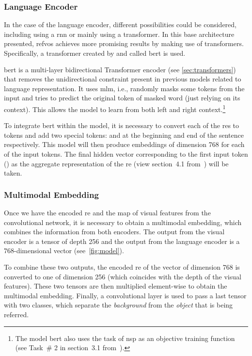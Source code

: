 \subsubsection{Language Encoder}

In the case of the language encoder, different possibilities could be
considered, including using a \gls{rnn} or mainly using a transformer. In this
base architecture presented, \gls{refvos} achieves more promising results by
making use of transformers. Specifically, a transformer created by
 and called \gls{bert} is used.

\gls{bert} is a multi-layer bidirectional Transformer encoder (see
\vref{sec:transformers}) that removes the unidirectional constraint present in
previous models related to language representation. It uses \gls{mlm}, i.e.,
randomly masks some tokens from the input and tries to predict the original
token of masked word (just relying on its context). This allows the model to
learn from both left and right context.\footnote{The model \gls{bert} also uses
  the task of \gls{nsp} as an objective training function (see Task~\# 2 in
  section~3.1 from~\cite{devlin19:bert}).}

To integrate \gls{bert} within the model, it is necessary to convert each of
the \glspl{re} to tokens and add two special tokens: \code{[CLS]} and
\code{[SEP]} at the beginning and end of the sentence respectively. This model
will then produce embeddings of dimension 768 for each of the input tokens. The
final hidden vector corresponding to the first input token (\code{[CLS]}) as
the aggregate representation of the \gls{re} (view section~4.1
from~\cite{devlin19:bert}) will be taken.

\subsubsection{Multimodal Embedding}

Once we have the encoded \gls{re} and the map of visual features from the
convolutional network, it is necessary to obtain a multimodal embedding, which
combines the information from both encoders. The output from the visual encoder
is a tensor of depth 256 and the output from the language encoder is a
768-dimensional vector (see\ \vref{fig:model}).

To combine these two outputs, the encoded \gls{re} of the vector of dimension
768 is converted to one of dimension 256 (which coincides with the depth of the
visual features). These two tensors are then multiplied element-wise to obtain
the multimodal embedding. Finally, a convolutional layer is used to pass a last
tensor with two classes, which separate the \emph{background} from the
\emph{object} that is being referred.


